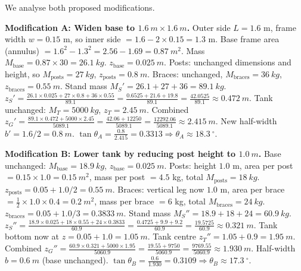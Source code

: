 \documentclass[11pt]{article}
\begin{document}
\begin{exoresolu}
We analyse both proposed modifications.

\textbf{Modification A: Widen base to $\SI{1.6}{m} \times \SI{1.6}{m}$.}
Outer side $L = 1.6$ m, frame width $w = 0.15$ m, so inner side $= 1.6 - 2\times0.15 = 1.3$ m.
Base frame area (annulus) $= 1.6^2 - 1.3^2 = 2.56 - 1.69 = \SI{0.87}{m^2}$.
Mass $M_{\text{base}} = 0.87 \times 30 = \SI{26.1}{kg}$. $z_{\text{base}} = \SI{0.025}{m}$.
Posts: unchanged dimensions and height, so $M_{\text{posts}} = \SI{27}{kg}$, $z_{\text{posts}} = \SI{0.8}{m}$.
Braces: unchanged, $M_{\text{braces}} = \SI{36}{kg}$, $z_{\text{braces}} = \SI{0.55}{m}$.
Stand mass $M_S' = 26.1 + 27 + 36 = \SI{89.1}{kg}$.
$z_S' = \frac{26.1\times0.025 + 27\times0.8 + 36\times0.55}{89.1} = \frac{0.6525 + 21.6 + 19.8}{89.1} = \frac{42.0525}{89.1} \approx \SI{0.472}{m}$.
Tank unchanged: $M_T = \SI{5000}{kg}$, $z_T = \SI{2.45}{m}$.
Combined $z_G' = \frac{89.1\times0.472 + 5000\times2.45}{5089.1} = \frac{42.06 + 12250}{5089.1} = \frac{12292.06}{5089.1} \approx \SI{2.415}{m}$.
New half-width $b' = 1.6/2 = \SI{0.8}{m}$.
$\tan\theta_A = \frac{0.8}{2.415} = 0.3313 \Rightarrow \theta_A \approx \SI{18.3}{\ensuremath{{}^{\circ}}}$.

\textbf{Modification B: Lower tank by reducing post height to $\SI{1.0}{m}$.}
Base unchanged: $M_{\text{base}} = \SI{18.9}{kg}$, $z_{\text{base}} = \SI{0.025}{m}$.
Posts: height $1.0$ m, area per post $= 0.15 \times 1.0 = \SI{0.15}{m^2}$, mass per post $= 4.5$ kg, total $M_{\text{posts}} = \SI{18}{kg}$. $z_{\text{posts}} = 0.05 + 1.0/2 = \SI{0.55}{m}$.
Braces: vertical leg now $1.0$ m, area per brace $= \frac{1}{2} \times 1.0 \times 0.4 = \SI{0.2}{m^2}$, mass per brace $= 6$ kg, total $M_{\text{braces}} = \SI{24}{kg}$. $z_{\text{braces}} = 0.05 + 1.0/3 = \SI{0.3833}{m}$.
Stand mass $M_S'' = 18.9 + 18 + 24 = \SI{60.9}{kg}$.
$z_S'' = \frac{18.9\times0.025 + 18\times0.55 + 24\times0.3833}{60.9} = \frac{0.4725 + 9.9 + 9.2}{60.9} = \frac{19.5725}{60.9} \approx \SI{0.321}{m}$.
Tank bottom now at $z = 0.05 + 1.0 = \SI{1.05}{m}$. Tank centre $z_T'' = 1.05 + 0.9 = \SI{1.95}{m}$.
Combined $z_G'' = \frac{60.9\times0.321 + 5000\times1.95}{5060.9} = \frac{19.55 + 9750}{5060.9} = \frac{9769.55}{5060.9} \approx \SI{1.930}{m}$.
Half-width $b = \SI{0.6}{m}$ (base unchanged).
$\tan\theta_B = \frac{0.6}{1.930} = 0.3109 \Rightarrow \theta_B \approx \SI{17.3}{\ensuremath{{}^{\circ}}}$.


\end{exoresolu}
\end{document}
